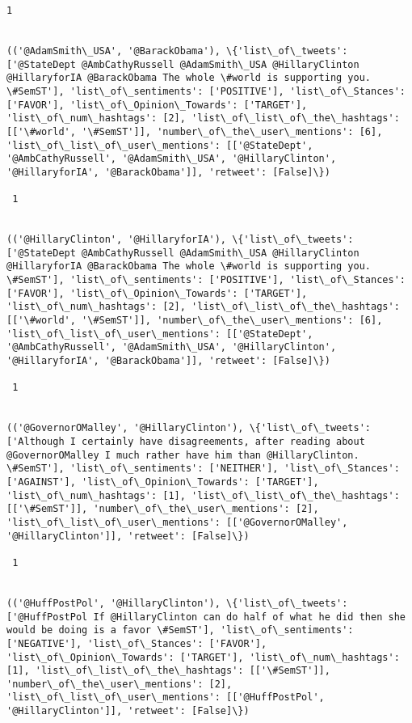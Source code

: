 \documentclass[11pt]{article}
\begin{document}
\begin{Verbatim}[commandchars=\\\{\}]
 1
 

(('@AdamSmith\_USA', '@BarackObama'), \{'list\_of\_tweets': ['@StateDept @AmbCathyRussell @AdamSmith\_USA @HillaryClinton @HillaryforIA @BarackObama The whole \#world is supporting you. \#SemST'], 'list\_of\_sentiments': ['POSITIVE'], 'list\_of\_Stances': ['FAVOR'], 'list\_of\_Opinion\_Towards': ['TARGET'], 'list\_of\_num\_hashtags': [2], 'list\_of\_list\_of\_the\_hashtags': [['\#world', '\#SemST']], 'number\_of\_the\_user\_mentions': [6], 'list\_of\_list\_of\_user\_mentions': [['@StateDept', '@AmbCathyRussell', '@AdamSmith\_USA', '@HillaryClinton', '@HillaryforIA', '@BarackObama']], 'retweet': [False]\})

 1
 

(('@HillaryClinton', '@HillaryforIA'), \{'list\_of\_tweets': ['@StateDept @AmbCathyRussell @AdamSmith\_USA @HillaryClinton @HillaryforIA @BarackObama The whole \#world is supporting you. \#SemST'], 'list\_of\_sentiments': ['POSITIVE'], 'list\_of\_Stances': ['FAVOR'], 'list\_of\_Opinion\_Towards': ['TARGET'], 'list\_of\_num\_hashtags': [2], 'list\_of\_list\_of\_the\_hashtags': [['\#world', '\#SemST']], 'number\_of\_the\_user\_mentions': [6], 'list\_of\_list\_of\_user\_mentions': [['@StateDept', '@AmbCathyRussell', '@AdamSmith\_USA', '@HillaryClinton', '@HillaryforIA', '@BarackObama']], 'retweet': [False]\})

 1
 

(('@GovernorOMalley', '@HillaryClinton'), \{'list\_of\_tweets': ['Although I certainly have disagreements, after reading about @GovernorOMalley I much rather have him than @HillaryClinton. \#SemST'], 'list\_of\_sentiments': ['NEITHER'], 'list\_of\_Stances': ['AGAINST'], 'list\_of\_Opinion\_Towards': ['TARGET'], 'list\_of\_num\_hashtags': [1], 'list\_of\_list\_of\_the\_hashtags': [['\#SemST']], 'number\_of\_the\_user\_mentions': [2], 'list\_of\_list\_of\_user\_mentions': [['@GovernorOMalley', '@HillaryClinton']], 'retweet': [False]\})

 1
 

(('@HuffPostPol', '@HillaryClinton'), \{'list\_of\_tweets': ['@HuffPostPol If @HillaryClinton can do half of what he did then she would be doing is a favor \#SemST'], 'list\_of\_sentiments': ['NEGATIVE'], 'list\_of\_Stances': ['FAVOR'], 'list\_of\_Opinion\_Towards': ['TARGET'], 'list\_of\_num\_hashtags': [1], 'list\_of\_list\_of\_the\_hashtags': [['\#SemST']], 'number\_of\_the\_user\_mentions': [2], 'list\_of\_list\_of\_user\_mentions': [['@HuffPostPol', '@HillaryClinton']], 'retweet': [False]\})


\end{Verbatim}
\end{document}
